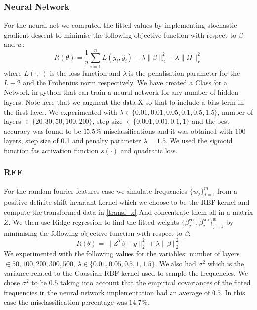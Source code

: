 \documentclass{article} %
\begin{document}
\subsubsection{Neural Network}
For the neural net we computed the fitted values by implementing stochastic gradient descent to minimise the following objective function with respect to $\beta$ and $w$:
 $$ R(\theta) = \frac{1}{n} \sum_{i=1}^{n}L(y_{i}, \hat{y}_{i}) + \lambda \| \beta \|^2 _{2} + \lambda \| \Omega \|^2_{F}$$
 where $L(\cdot,\cdot)$ is the loss function and $\lambda$ is the penalisation parameter for the $L-2$ and the Frobenius norm respectively. 
 We have created a Class for a Network in python that can train a neural network for any number of hidden layers. Note here that we augment the data X so that to include a bias term in the first layer.
 We experimented with $\lambda \in \{ 0.01, 0.01, 0.05, 0.1, 0.5, 1.5\} $,  number of layers $\in \{ 20, 30, 50,  100, 200\} $, step size $ \in \{ 0.001, 0.01, 0.1, 1\}$ and the best accuracy was found to be $15.5\%$ misclassifications and it was obtained with 100 layers, step size of 0.1 and penalty parameter $\lambda = 1.5$. We used the sigmoid function fas activation function $s( \cdot )$ and quadratic loss. 

\subsubsection{RFF}
For the random fourier features case we simulate frequencies
 $ \{ w_{j} \}_{j=1}^{m}$ from a positive definite shift invariant kernel which we choose to be the RBF kernel and compute the transformed 
data in 
\eqref{transf_x} 
And concentrate them all in a matrix $Z$.
We then use Ridge regression to find the fitted weights $\{ \beta_{j}^{\cos}, \beta_{j}^{\sin}\}_{j=1}^{m}$
by minimising the following objective function with respect to 
$\beta$:
 $$ R(\theta) = \| Z^{T} \beta - y\|^2_{2} + \lambda \| \beta\|^2 _{2} $$
We experimented with the following values for the variables: number of layers $\in { 50,100,200,300,500}$, $\lambda \in \{ 0.01, 0.05, 0.5, 1, 1.5\}$. We also had  $\sigma^2$ which is the variance related to the Gaussian RBF kernel used to sample the frequencies. We chose  $\sigma^2$ to be $0.5$ taking into account that the empirical covariances of the fitted frequencies in the neural network implementation had an average of $0.5.$ In this case the misclassification percentage was $14.7 \%$.
\end{document}
